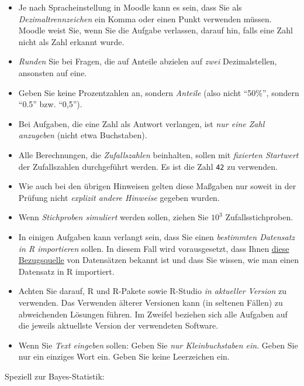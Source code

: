 \documentclass[
  a4paper,
  DIV=11]{scrreprt}
\providecommand{\tightlist}{%
  \setlength{\itemsep}{0pt}\setlength{\parskip}{0pt}}\usepackage{longtable,booktabs,array}
\theoremstyle{definition}
\theoremstyle{remark}
\begin{document}
\begin{itemize}
\tightlist
\item
  Je nach Spracheinstellung in Moodle kann es sein, dass Sie als
  \emph{Dezimaltrennzeichen} ein Komma oder einen Punkt verwenden
  müssen. Moodle weist Sie, wenn Sie die Aufgabe verlassen, darauf hin,
  falls eine Zahl nicht als Zahl erkannt wurde.
\item
  \emph{Runden} Sie bei Fragen, die auf Anteile abzielen auf \emph{zwei}
  Dezimalstellen, ansonsten auf eine.
\item
  Geben Sie keine Prozentzahlen an, sondern \emph{Anteile} (also nicht
  ``50\%'', sondern ``0.5'' bzw. ``0,5'').
\item
  Bei Aufgaben, die eine Zahl als Antwort verlangen, ist \emph{nur eine
  Zahl anzugeben} (nicht etwa Buchstaben).
\item
  Alle Berechnungen, die \emph{Zufallszahlen} beinhalten, sollen mit
  \emph{fixierten Startwert} der Zufallszahlen durchgeführt werden. Es
  ist die Zahl \texttt{42} zu verwenden.
\item
  Wie auch bei den übrigen Hinweisen gelten diese Maßgaben nur soweit in
  der Prüfung nicht \emph{explizit andere Hinweise} gegeben wurden.
\item
  Wenn \emph{Stichproben simuliert} werden sollen, ziehen Sie \(10^3\)
  Zufallsstichproben.
\item
  In einigen Aufgaben kann verlangt sein, dass Sie einen
  \emph{bestimmten Datensatz in R importieren} sollen. In diesem Fall
  wird vorausgesetzt, dass Ihnen
  \href{https://vincentarelbundock.github.io/Rdatasets/articles/data.html}{diese
  Bezugsquelle} von Datensätzen bekannt ist und dass Sie wissen, wie man
  einen Datensatz in R importiert.
\item
  Achten Sie darauf, R und R-Pakete sowie R-Studio \emph{in aktueller
  Version} zu verwenden. Das Verwenden älterer Versionen kann (in
  seltenen Fällen) zu abweichenden Lösungen führen. Im Zweifel beziehen
  sich alle Aufgaben auf die jeweils aktuellste Version der verwendeten
  Software.
\item
  Wenn Sie \emph{Text eingeben} sollen: Geben Sie \emph{nur
  Kleinbuchstaben ein}. Geben Sie nur ein einziges Wort ein. Geben Sie
  keine Leerzeichen ein.
\end{itemize}

Speziell zur Bayes-Statistik:
\end{document}

